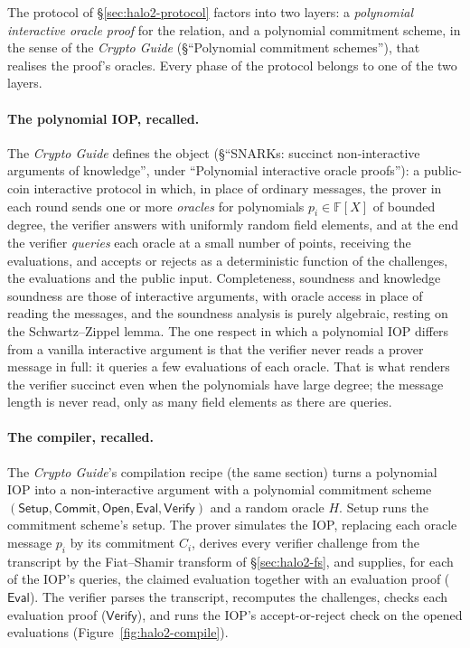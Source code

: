 \documentclass[11pt,a4paper]{article}
\theoremstyle{definition}
\newcommand{\F}{\mathbb{F}}
\newcommand{\Comm}{\mathsf{Commit}}
\newcommand{\Open}{\mathsf{Open}}
\newcommand{\Setup}{\mathsf{Setup}}
\newcommand{\Verify}{\mathsf{Verify}}
\begin{document}
The protocol of \S\ref{sec:halo2-protocol} factors into two layers: a
\emph{polynomial interactive oracle proof} for the relation, and a
polynomial commitment scheme, in the sense of the \emph{Crypto Guide}
(\S``Polynomial commitment schemes''), that realises the proof's oracles.
Every phase of the protocol belongs to one of the two layers.

\paragraph{The polynomial IOP, recalled.}
The \emph{Crypto Guide} defines the object (\S``SNARKs: succinct
non-interactive arguments of knowledge'', under ``Polynomial interactive
oracle proofs''): a public-coin interactive protocol in which, in place of
ordinary messages, the prover in each round sends one or more
\emph{oracles} for polynomials $p_i \in \F[X]$ of bounded degree, the
verifier answers with uniformly random field elements, and at the end
the verifier \emph{queries} each oracle at a small number of points,
receiving the evaluations, and accepts or rejects as a deterministic
function of the challenges, the evaluations and the public input.
Completeness, soundness and knowledge soundness are those of interactive
arguments, with oracle access in place of reading the messages, and the
soundness analysis is purely algebraic, resting on the Schwartz--Zippel
lemma. The one respect in which a polynomial IOP differs from a vanilla
interactive argument is that the verifier never reads a prover message in
full: it queries a few evaluations of each oracle. That is what renders
the verifier succinct even when the polynomials have large degree; the
message length is never read, only as many field elements as there are
queries.

\paragraph{The compiler, recalled.}
The \emph{Crypto Guide}'s compilation recipe (the same section) turns a
polynomial IOP into a non-interactive argument with a polynomial
commitment scheme $(\Setup, \Comm, \Open, \mathsf{Eval}, \Verify)$ and a
random oracle $H$. Setup runs the commitment scheme's setup. The prover
simulates the IOP, replacing each oracle message $p_i$ by its commitment
$C_i$, derives every verifier challenge from the transcript by the
Fiat--Shamir transform of \S\ref{sec:halo2-fs}, and supplies, for each
of the IOP's queries, the claimed evaluation together with an evaluation
proof ($\mathsf{Eval}$). The verifier parses the transcript, recomputes
the challenges, checks each evaluation proof ($\Verify$), and runs the
IOP's accept-or-reject check on the opened evaluations
(Figure~\ref{fig:halo2-compile}).
\end{document}
